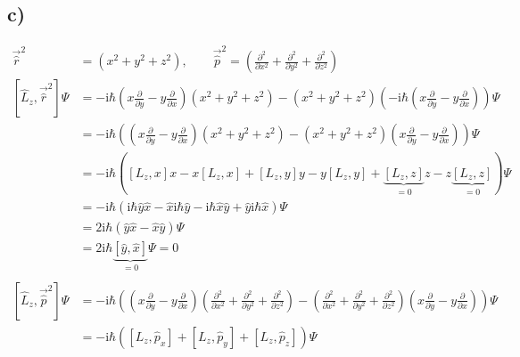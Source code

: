     \subsection{c)}

    \begin{align*}
        \vec{\hat{r}}^2 &= \left( x^2+y^2+z^2 \right), \qquad \vec{\hat{p}}^2 = \left(\frac{\partial^2}{\partial x^2}+\frac{\partial^2}{\partial y^2}+\frac{\partial^2}{\partial z^2} \right)\\
        \left[ \hat{L}_z,\vec{\hat{r}}^2 \right] \Psi &= -\text{i}\hbar \left( x\frac{\partial}{\partial y} - y\frac{\partial}{\partial x} \right) \left( x^2+y^2+z^2 \right) - \left( x^2+y^2+z^2 \right) \left(-\text{i}\hbar \left( x\frac{\partial}{\partial y} - y\frac{\partial}{\partial x} \right)\right)\Psi\\
        &= -\text{i}\hbar \left(\left( x\frac{\partial}{\partial y} - y\frac{\partial}{\partial x} \right) \left( x^2+y^2+z^2 \right) - \left( x^2+y^2+z^2 \right) \left( x\frac{\partial}{\partial y} - y\frac{\partial}{\partial x} \right)\right)\Psi\\
        &= -\text{i}\hbar\left( \left[ L_z,x \right]x - x\left[ L_z,x \right] + \left[ L_z,y \right]y - y\left[ L_z,y \right] + \underbrace{\left[ L_z,z \right]}_{=0}z - z\underbrace{\left[ L_z,z \right]}_{=0}\right) \Psi\\
        &= -\text{i}\hbar\left( \text{i}\hbar \hat{y}\hat{x} - \hat{x}\text{i}\hbar\hat{y} - \text{i}\hbar \hat{x}\hat{y} + \hat{y}\text{i}\hbar\hat{x} \right) \Psi\\
        &= 2\text{i}\hbar \left( \hat{y}\hat{x}-\hat{x}\hat{y} \right) \Psi\\
        &= 2\text{i}\hbar \underbrace{\left[ \hat{y},\hat{x} \right]}_{=0} \Psi = 0\\
        \\
        \left[ \hat{L}_z,\vec{\hat{p}}^2 \right] \Psi &= -\text{i}\hbar \left(\left( x\frac{\partial}{\partial y} - y\frac{\partial}{\partial x} \right) \left(\frac{\partial^2}{\partial x^2}+\frac{\partial^2}{\partial y^2}+\frac{\partial^2}{\partial z^2} \right) - \left(\frac{\partial^2}{\partial x^2}+\frac{\partial^2}{\partial y^2}+\frac{\partial^2}{\partial z^2} \right) \left( x\frac{\partial}{\partial y} - y\frac{\partial}{\partial x} \right)\right)\Psi\\
        &= -\text{i}\hbar\left( \left[ L_z,\hat{p}_x \right] + \left[ L_z,\hat{p}_y \right] + \left[ L_z,\hat{p}_z \right] \right)\Psi\\

\end{align*}
